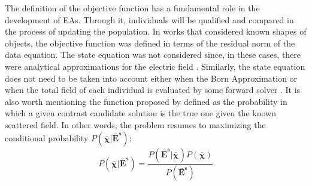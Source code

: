 			The definition of the objective function has a fundamental role in the development of EAs. Through it, individuals will be qualified and compared in the process of updating the population. In works that considered known shapes of objects, the objective function was defined in terms of the residual norm of the data equation. The state equation was not considered since, in these cases, there were analytical approximations for the electric field \citep{kent1997dielectric,qing2001electromagnetic,caorsi2003detection,chiu1996image,michalski2001electromagnetic}. Similarly, the state equation does not need to be taken into account either when the Born Approximation \citep{caorsi2000two,yang2021fft} or when the total field of each individual is evaluated by some forward solver \citep{noghanian2014microwave,huang2008time}. It is also worth mentioning the function proposed by \cite{caorsi1991microwave} defined as the probability in which a given contrast candidate solution is the true one given the known scattered field. In other words, the problem resumes to maximizing the conditional probability $P(\boldsymbol{\bar{\chi}}|\mathbf{\bar{E}^s})$:
			\begin{equation}
				P(\boldsymbol{\bar{\chi}}|\mathbf{\bar{E}^s}) = \frac{P(\mathbf{\bar{E}^s}|\boldsymbol{\bar{\chi}})P(\boldsymbol{\bar{\chi}})}{P(\mathbf{\bar{E}^s})} \label{eq:3:stochastic:objfun:prob}
			\end{equation}
		
